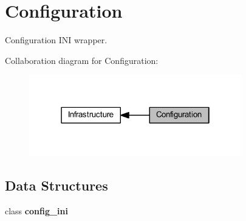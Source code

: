 \section{Configuration}
\label{group__configuration}


Configuration I\+NI wrapper.  


Collaboration diagram for Configuration\+:\nopagebreak
\begin{figure}[H]
\begin{center}
\leavevmode
\includegraphics[width=262pt]{group__configuration}
\end{center}
\end{figure}
\subsection*{Data Structures}
\begin{DoxyCompactItemize}
\item 
class \textbf{ config\+\_\+ini}
\end{DoxyCompactItemize}

